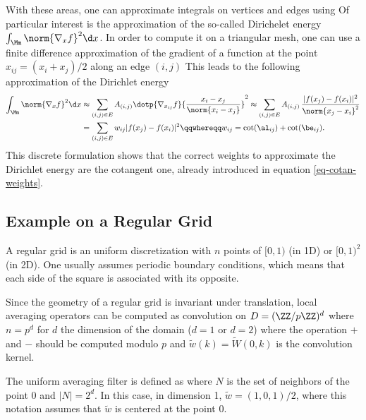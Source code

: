 With these areas, one can approximate integrals on vertices and edges using
Of particular interest is the approximation of the so-called Dirichelet energy $\int_{\Mm} \norm{\nabla_x f}^2 \d x$. In order to compute it on a triangular mesh, one can use a finite difference approximation of the gradient of a function at the point $x_{ij} = (x_i+x_j)/2$ along an edge $(i,j)$
This leads to the following approximation of the Dirichlet energy
\begin{align}
	\int_{\Mm} \norm{\nabla_x f}^2 \d x
	& \approx \sum_{(i,j)\in E} A_{(i,j)} \dotp{\nabla_{x_{ij}} f}{ \frac{x_i-x_j}{\norm{x_i-x_j}} }^2
	\approx \sum_{(i,j) \in E} A_{(i,j)} \, \frac{|f(x_j)-f(x_i)|^2}{\norm{x_j-x_i}^2} \\
	& =  \sum_{(i,j) \in E} w_{ij} |f(x_j)-f(x_i)|^2
	\qqwhereqq
	w_{ij} = \cot(\al_{ij})+\cot(\be_{ij}). \label{eq-dirichlet-discr}
\end{align}
This discrete formulation shows that the correct weights to approximate the Dirichlet energy are the cotangent one, already introduced in equation \eqref{eq-cotan-weights}.

\subsection{Example on a Regular Grid}

A regular grid is an uniform discretization with $n$ points of $[0,1)$ (in 1D) or $[0,1)^2$ (in 2D). One usually assumes periodic boundary conditions, which means that each side of the square is associated with its opposite. 

Since the geometry of a regular grid is invariant under translation, local averaging operators can be computed as convolution on $D = (\ZZ/p\ZZ)^d$ where $n=p^d$ for $d$ the dimension of the domain ($d=1$ or $d=2$)
where the operation $+$ and $-$ should be computed modulo $p$ and $\tilde w(k) = \tilde W(0,k)$ is the convolution kernel.

\begin{exmp}[Averaging] The uniform averaging filter is defined as
where $N$ is the set of neighbors of the point $0$ and $|N|=2^d$. In this case, in dimension 1, $\tilde w = (1,0,1)/2$, where this notation assumes that $\tilde w$ is centered at the point $0$.
\end{exmp}

